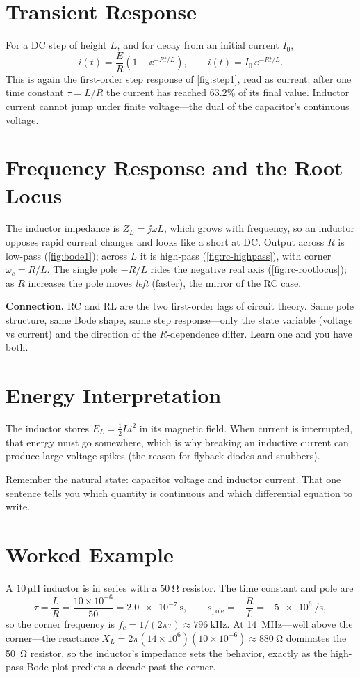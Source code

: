 \section{Transient Response}
For a DC step of height \(E\), and for decay from an initial current \(I_0\),
\[
i(t)=\frac{E}{R}\left(1-\ee^{-Rt/L}\right),
\qquad
i(t)=I_0\,\ee^{-Rt/L}.
\]
This is again the first-order step response of \cref{fig:step1}, read as current:
after one time constant \(\tau=L/R\) the current has reached \(63.2\%\) of its
final value. Inductor current cannot jump under finite voltage---the dual of the
capacitor's continuous voltage.

\section{Frequency Response and the Root Locus}
The inductor impedance is \(Z_L=\jj\omega L\), which grows with frequency, so an
inductor opposes rapid current changes and looks like a short at DC. Output across
\(R\) is low-pass (\cref{fig:bode1}); across \(L\) it is high-pass
(\cref{fig:rc-highpass}), with corner \(\omega_c=R/L\). The single pole
\(-R/L\) rides the negative real axis (\cref{fig:rc-rootlocus}); as \(R\)
increases the pole moves \emph{left} (faster), the mirror of the RC case.

\begin{controlsbox}
\textbf{Connection.} RC and RL are the two first-order lags of circuit theory.
Same pole structure, same Bode shape, same step response---only the state
variable (voltage vs current) and the direction of the \(R\)-dependence differ.
Learn one and you have both.
\end{controlsbox}

\section{Energy Interpretation}
The inductor stores \(E_L=\tfrac12 Li^2\) in its magnetic field. When current is
interrupted, that energy must go somewhere, which is why breaking an inductive
current can produce large voltage spikes (the reason for flyback diodes and
snubbers).

\begin{exambox}
Remember the natural state: capacitor voltage and inductor current. That one
sentence tells you which quantity is continuous and which differential equation
to write.
\end{exambox}

\section{Worked Example}
A \(\SI{10}{\micro\henry}\) inductor is in series with a \(\SI{50}{\ohm}\)
resistor. The time constant and pole are
\[
\tau=\frac{L}{R}=\frac{10\times10^{-6}}{50}=\SI{2.0e-7}{\second},
\qquad
s_{\text{pole}}=-\frac{R}{L}=-\SI{5e6}{\per\second},
\]
so the corner frequency is \(f_c=1/(2\pi\tau)\approx\SI{796}{\kilo\hertz}\). At
\SI{14}{\mega\hertz}---well above the corner---the reactance
\(X_L=2\pi(14\times10^6)(10\times10^{-6})\approx\SI{880}{\ohm}\) dominates the
\SI{50}{\ohm} resistor, so the inductor's impedance sets the behavior, exactly as
the high-pass Bode plot predicts a decade past the corner.
